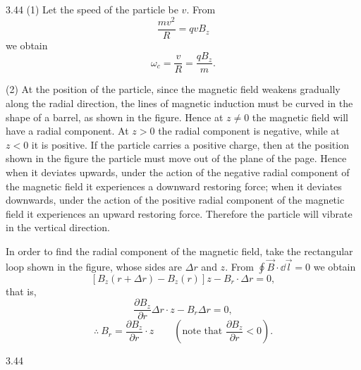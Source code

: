 \begin{solution}{3.44}
(1) Let the speed of the particle be $v$. From
\[
\frac{mv^2}{R}=qvB_z
\]
we obtain
\[
\omega_c=\frac{v}{R}=\frac{qB_z}{m}.
\]

(2) At the position of the particle, since the magnetic field weakens gradually along the radial direction, the lines of magnetic induction must be curved in the shape of a barrel, as shown in the figure. Hence at $z\neq0$ the magnetic field will have a radial component. At $z>0$ the radial component is negative, while at $z<0$ it is positive. If the particle carries a positive charge, then at the position shown in the figure the particle must move out of the plane of the page. Hence when it deviates upwards, under the action of the negative radial component of the magnetic field it experiences a downward restoring force; when it deviates downwards, under the action of the positive radial component of the magnetic field it experiences an upward restoring force. Therefore the particle will vibrate in the vertical direction.

In order to find the radial component of the magnetic field, take the rectangular loop shown in the figure, whose sides are $\Delta r$ and $z$. From $\oint\vec{B}\cdot\dd\vec{l}=0$ we obtain
\[
\left[B_z(r+\Delta r)-B_z(r)\right]z-B_r\cdot\Delta r=0,
\]
that is,
\[
\frac{\partial B_z}{\partial r}\Delta r\cdot z-B_r\Delta r=0,
\]
\[
\therefore\ B_r=\frac{\partial B_z}{\partial r}\cdot z\qquad\left(\text{note that }\frac{\partial B_z}{\partial r}<0\right).
\]

\begin{figbox}{3.44}
\end{figbox}


\end{solution}
